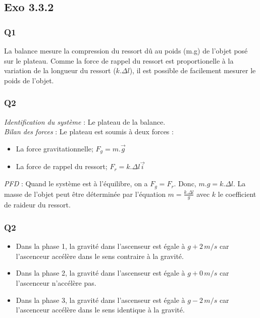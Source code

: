 \documentclass[]{book}
\theoremstyle{definition}
\begin{document}
\subsection*{Exo 3.3.2}
\subsubsection*{Q1}
La balance mesure la compression du ressort d\^u au poids (m.g) de l'objet pos\'e sur le plateau. Comme la force de rappel du ressort est proportionelle \`a la variation de la longueur du ressort ($k.\Delta l$), il est possible de facilement mesurer le poids de l'objet.


\subsubsection*{Q2}
\emph{Identification du syst\`eme} : Le plateau de la balance.\\


\emph{Bilan des forces} : Le plateau est soumis \`a deux forces : 
\begin{itemize}
\item La force gravitationnelle; $F_g = m.\overrightarrow{g}$
\item La force de rappel du ressort; $F_r = k.\Delta l \overrightarrow{i}$ 
\end{itemize}


\emph{PFD} :  
Quand le syst\`eme est \`a l'\'equilibre, on a $F_g = F_r$. Donc, $m.g = k.\Delta l$. La masse de l'objet peut \^etre d\'etermin\'ee par l'\'equation $m = \frac{k.\Delta l}{g}$ avec $k$ le coefficient de raideur du ressort.


\subsubsection*{Q2}

\begin{itemize}
\item Dans la phase 1, la gravit\'e dans l'ascenseur est \'egale \`a $g + 2\, m/s$ car l'ascenceur acc\'el\`ere dans le sens contraire \`a la gravit\'e.
\item Dans la phase 2, la gravit\'e dans l'ascenseur est \'egale \`a $g + 0\, m/s$ car l'ascenceur n'acc\'el\`ere pas.
\item Dans la phase 3, la gravit\'e dans l'ascenseur est \'egale \`a $g - 2\, m/s$ car l'ascenceur acc\'el\`ere dans le sens identique \`a la gravit\'e.
\end{itemize}
\end{document}

